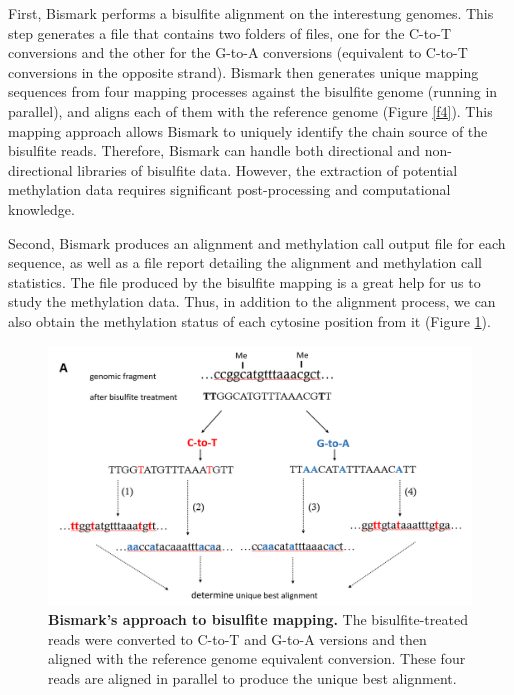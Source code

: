 \documentclass{PHlab-thesis}
\begin{document}
\par
First, Bismark performs a bisulfite alignment on the interestung genomes. This step generates a file that contains two folders of files, one for the C-to-T conversions and the other for the G-to-A conversions (equivalent to C-to-T conversions in the opposite strand). Bismark then generates unique mapping sequences from four mapping processes against the bisulfite genome (running in parallel), and aligns each of them with the reference genome (Figure \ref{f4}). This mapping approach allows Bismark to uniquely identify the chain source of the bisulfite reads. Therefore, Bismark can handle both directional and non-directional libraries of bisulfite data. However, the extraction of potential methylation data requires significant post-processing and computational knowledge.

\par
Second, Bismark produces an alignment and methylation call output file for each sequence, as well as a file report detailing the alignment and methylation call statistics. The file produced by the bisulfite mapping is a great help for us to study the methylation data. Thus, in addition to the alignment process, we can also obtain the methylation status of each cytosine position from it (Figure \ref{f3}).

\begin{figure}[h!]
  \centering
  \includegraphics[scale=0.8]{figures/bismark-a.png}
  \caption{\textbf{Bismark’s approach to bisulfite mapping.}
  The bisulfite-treated reads were converted to C-to-T and G-to-A versions and then aligned with the reference genome equivalent conversion. These four reads are aligned in parallel to produce the unique best alignment.}
  \label{f3}
\end{figure}
\end{document}
